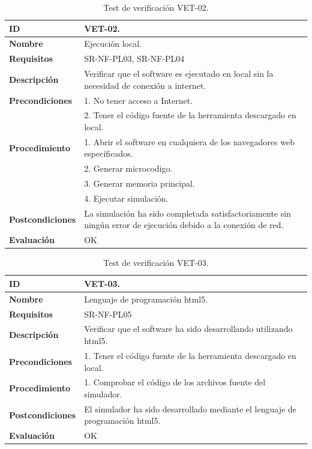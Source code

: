 \begin{center}
\begin{table}[htb]
\centering
\caption{Test de verificación VET-02.}
\begin{tabular}{@{}p{2.5cm} p{13cm}@{}} 
\toprule
\textbf{ID} 					& VET-02. \\
\midrule
\textbf{Nombre} 				& Ejecución local. \\
\midrule
\textbf{Requisitos} 		& SR-NF-PL03, SR-NF-PL04\\
\midrule
\textbf{Descripción} 		& Verificar que el \gls{software} es ejecutado en local sin la necesidad de conexión a internet. \\
\midrule
\textbf{Precondiciones}		& 1. No tener acceso a Internet.\\
											& 2. Tener el código fuente de la herramienta descargado en local.\\
\midrule
\textbf{Procedimiento}			& 1. Abrir el \gls{software} en cualquiera de los navegadores web especificados. \\
							& 2. Generar \gls{microcodigo}.\\
							& 3. Generar memoria principal.\\
							& 4. Ejecutar simulación.\\
\midrule
\textbf{Postcondiciones} 		&  La simulación ha sido completada satisfactoriamente sin ningún error de ejecución debido a la conexión de red.\\
\midrule
\textbf{Evaluación} 			& OK \\
\bottomrule
\end{tabular}
\label{tab:vet02}
\end{table}
\end{center}

\begin{center}
\begin{table}[htb]
\centering
\caption{Test de verificación VET-03.}
\begin{tabular}{@{}p{2.5cm} p{13cm}@{}} 
\toprule
\textbf{ID} 					& VET-03. \\
\midrule
\textbf{Nombre} 				& Lenguaje de programación \acrshort{html}5. \\
\midrule
\textbf{Requisitos} 		& SR-NF-PL05\\
\midrule
\textbf{Descripción} 		& Verificar que el \gls{software} ha sido desarrollando utilizando \acrshort{html}5. \\
\midrule
\textbf{Precondiciones}		& 1. Tener el código fuente de la herramienta descargado en local. \\
\midrule
\textbf{Procedimiento}		& 1. Comprobar el código de los archivos fuente del simulador.\\
\midrule
\textbf{Postcondiciones} 		&  El simulador ha sido desarrollado mediante el lenguaje de programación \acrshort{html}5.\\
\midrule
\textbf{Evaluación} 			& OK \\
\bottomrule
\end{tabular}
\label{tab:vet03}
\end{table}
\end{center}


